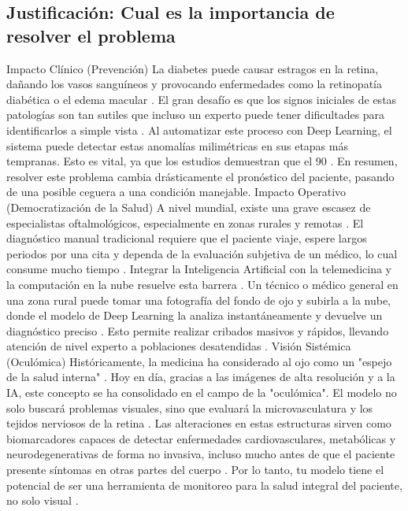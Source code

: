 \documentclass[12pt, a4paper]{article}
\begin{document}
\subsection{Justificación: Cual es la importancia de resolver el problema}

Impacto Clínico (Prevención) La diabetes puede causar estragos en la retina, dañando los vasos sanguíneos y provocando enfermedades como la retinopatía diabética o el edema macular
. El gran desafío es que los signos iniciales de estas patologías son tan sutiles que incluso un experto puede tener dificultades para identificarlos a simple vista
. Al automatizar este proceso con Deep Learning, el sistema puede detectar estas anomalías milimétricas en sus etapas más tempranas. Esto es vital, ya que los estudios demuestran que el 90%
. En resumen, resolver este problema cambia drásticamente el pronóstico del paciente, pasando de una posible ceguera a una condición manejable.
Impacto Operativo (Democratización de la Salud) A nivel mundial, existe una grave escasez de especialistas oftalmológicos, especialmente en zonas rurales y remotas
. El diagnóstico manual tradicional requiere que el paciente viaje, espere largos periodos por una cita y dependa de la evaluación subjetiva de un médico, lo cual consume mucho tiempo
. Integrar la Inteligencia Artificial con la telemedicina y la computación en la nube resuelve esta barrera
. Un técnico o médico general en una zona rural puede tomar una fotografía del fondo de ojo y subirla a la nube, donde el modelo de Deep Learning la analiza instantáneamente y devuelve un diagnóstico preciso
. Esto permite realizar cribados masivos y rápidos, llevando atención de nivel experto a poblaciones desatendidas
.
Visión Sistémica (Oculómica) Históricamente, la medicina ha considerado al ojo como un "espejo de la salud interna"
. Hoy en día, gracias a las imágenes de alta resolución y a la IA, este concepto se ha consolidado en el campo de la "oculómica". El modelo no solo buscará problemas visuales, sino que evaluará la microvasculatura y los tejidos nerviosos de la retina
. Las alteraciones en estas estructuras sirven como biomarcadores capaces de detectar enfermedades cardiovasculares, metabólicas y neurodegenerativas de forma no invasiva, incluso mucho antes de que el paciente presente síntomas en otras partes del cuerpo
. Por lo tanto, tu modelo tiene el potencial de ser una herramienta de monitoreo para la salud integral del paciente, no solo visual
.
\end{document}
